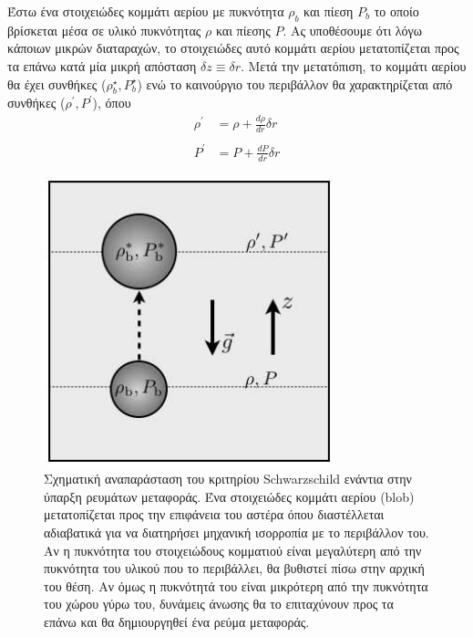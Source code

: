 Έστω ένα στοιχειώδες κομμάτι αερίου με πυκνότητα $\rho_b$ και πίεση $P_b$ το οποίο βρίσκεται μέσα σε υλικό πυκνότητας $\rho$ και πίεσης $P$. Ας υποθέσουμε ότι λόγω κάποιων μικρών διαταραχών, το στοιχειώδες αυτό κομμάτι αερίου μετατοπίζεται προς τα επάνω κατά μία μικρή απόσταση $\delta z \equiv \delta r$. Μετά την μετατόπιση, το κομμάτι αερίου θα έχει συνθήκες ($\rho_b^{\star}, P_b^{\star}$) ενώ το καινούργιο του περιβάλλον θα χαρακτηρίζεται από συνθήκες ($\rho^{\prime}, P^{\prime}$), όπου
\begin{align}
    \rho^{\prime} &= \rho + \frac{d\rho}{dr} \delta r \label{eq:convection:density_perturbation} \\ \nonumber \\
    P^{\prime} &= P + \frac{dP}{dr} \delta r \label{eq:convection:pressure_perturbation}
\end{align}


\begin{figure}[t]
    \centering
    \includegraphics[scale=0.6]{Figures/convection_scheme.png}
    \caption{Σχηματική αναπαράσταση του κριτηρίου Schwarzschild ενάντια στην ύπαρξη ρευμάτων μεταφοράς. Ένα στοιχειώδες κομμάτι αερίου (blob) μετατοπίζεται προς την επιφάνεια του αστέρα όπου διαστέλλεται αδιαβατικά για να διατηρήσει μηχανική ισορροπία με το περιβάλλον του. Αν η πυκνότητα του στοιχειώδους κομματιού είναι μεγαλύτερη από την πυκνότητα του υλικού που το περιβάλλει, θα βυθιστεί πίσω στην αρχική του θέση. Αν όμως η πυκνότητά του είναι μικρότερη από την πυκνότητα του χώρου γύρω του, δυνάμεις άνωσης θα το επιταχύνουν προς τα επάνω και θα δημιουργηθεί ένα ρεύμα μεταφοράς.}
    \label{fig:convection_scheme}
\end{figure}

